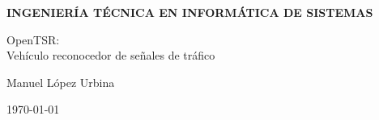 \begin{titlepage}
\begin{center}
    \vspace{1.0cm}

    \Large{\textbf{INGENIERÍA TÉCNICA EN INFORMÁTICA DE SISTEMAS}} \\

    \vspace{3.0cm}

    \Large{OpenTSR:\\ Vehículo reconocedor de señales de tráfico} \\

    \vspace{2.0cm}

    \Large{Manuel López Urbina} \\

    \vspace{0.5cm}

    \large{\today}

  \end{center}
\end{titlepage}
